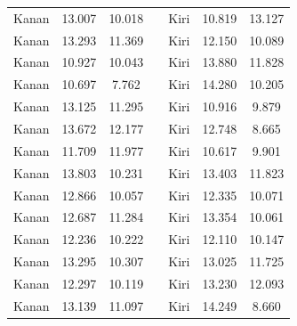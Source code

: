 \begin{longtable}{|c|c|c|c|c|c|c|}
  Kanan          & 13.007              & 10.018           &  & Kiri           & 10.819              & 13.127           \\ \cline{1-3} \cline{5-7} 
  Kanan          & 13.293              & 11.369           &  & Kiri           & 12.150              & 10.089           \\ \cline{1-3} \cline{5-7} 
  Kanan          & 10.927              & 10.043           &  & Kiri           & 13.880              & 11.828           \\ \cline{1-3} \cline{5-7} 
  Kanan          & 10.697              & 7.762            &  & Kiri           & 14.280              & 10.205           \\ \cline{1-3} \cline{5-7} 
  Kanan          & 13.125              & 11.295           &  & Kiri           & 10.916              & 9.879            \\ \cline{1-3} \cline{5-7} 
  Kanan          & 13.672              & 12.177           &  & Kiri           & 12.748              & 8.665            \\ \cline{1-3} \cline{5-7} 
  Kanan          & 11.709              & 11.977           &  & Kiri           & 10.617              & 9.901            \\ \cline{1-3} \cline{5-7} 
  Kanan          & 13.803              & 10.231           &  & Kiri           & 13.403              & 11.823           \\ \cline{1-3} \cline{5-7} 
  Kanan          & 12.866              & 10.057           &  & Kiri           & 12.335              & 10.071           \\ \cline{1-3} \cline{5-7} 
  Kanan          & 12.687              & 11.284           &  & Kiri           & 13.354              & 10.061           \\ \cline{1-3} \cline{5-7} 
  Kanan          & 12.236              & 10.222           &  & Kiri           & 12.110              & 10.147           \\ \cline{1-3} \cline{5-7} 
  Kanan          & 13.295              & 10.307           &  & Kiri           & 13.025              & 11.725           \\ \cline{1-3} \cline{5-7} 
  Kanan          & 12.297              & 10.119           &  & Kiri           & 13.230              & 12.093           \\ \cline{1-3} \cline{5-7} 
  Kanan          & 13.139              & 11.097           &  & Kiri           & 14.249              & 8.660            \\ \cline{1-3} \cline{5-7} 

\end{longtable}
